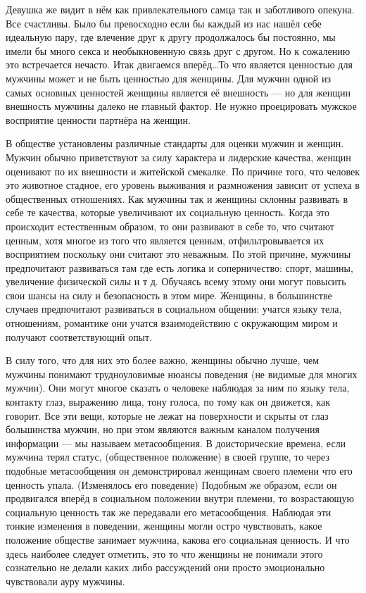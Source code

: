 Девушка же видит в нём как привлекательного самца так и заботливого опекуна. Все счастливы. Было бы превосходно если бы каждый из нас нашёл себе идеальную пару, где влечение друг к другу продолжалось бы постоянно, мы имели бы много секса и необыкновенную связь друг с другом. Но к сожалению это встречается нечасто. Итак двигаемся вперёд\ldots То что является ценностью для мужчины может и не быть ценностью для женщины. Для мужчин одной из самых основных ценностей женщины является её внешность --- но для женщин внешность мужчины далеко не главный фактор. Не нужно проецировать мужское восприятие ценности партнёра на женщин.

\RULE  В обществе установлены различные стандарты для оценки мужчин и женщин. Мужчин обычно приветствуют за силу характера и лидерские качества, женщин оценивают по их внешности и житейской смекалке. По причине того, что человек это животное стадное, его уровень выживания и размножения зависит от успеха в общественных отношениях. Как мужчины так и женщины склонны развивать в себе те качества, которые увеличивают их социальную ценность. Когда это происходит естественным образом, то они развивают в себе то, что считают ценным, хотя многое из того что является ценным, отфильтровывается их восприятием поскольку они считают это неважным. По этой причине, мужчины предпочитают развиваться там где есть логика и соперничество: спорт, машины, увеличение физической силы и т д. Обучаясь всему этому они могут повысить свои шансы на силу и безопасность в этом мире. Женщины, в большинстве случаев предпочитают развиваться в социальном общении: учатся языку тела, отношениям, романтике они учатся взаимодействию с окружающим миром и получают соответствующий опыт.

В силу того, что для них это более важно, женщины обычно лучше, чем мужчины понимают трудноуловимые нюансы поведения (не видимые для многих мужчин). Они могут многое сказать о человеке наблюдая за ним по языку тела, контакту глаз, выражению лица, тону голоса, по тому как он движется, как говорит. Все эти вещи, которые не лежат на поверхности и скрыты от глаз большинства мужчин, но при этом являются важным каналом получения информации --- мы называем метасообщения. В доисторические времена, если мужчина терял статус, (общественное положение) в своей группе, то через подобные метасообщения он демонстрировал женщинам своего племени что его ценность упала. (Изменялось его поведение) Подобным же образом, если он продвигался вперёд в социальном положении внутри племени, то возрастающую социальную ценность так же передавали его метасообщения. Наблюдая эти тонкие изменения в поведении, женщины могли остро чувствовать, какое положение обществе занимает мужчина, какова его социальная ценность. И что здесь наиболее следует отметить, это то что женщины не понимали этого сознательно не делали каких либо рассуждений они просто эмоционально чувствовали ауру мужчины.

